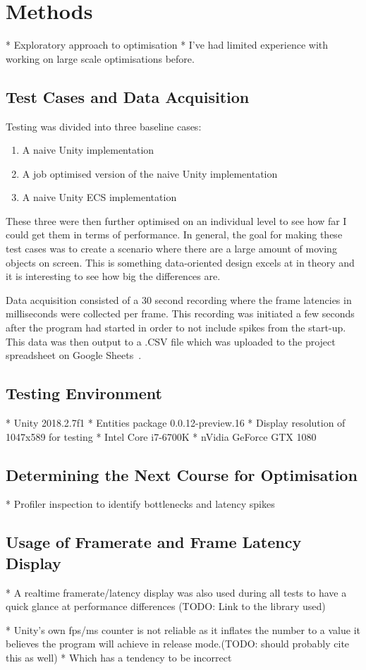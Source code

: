 \section{Methods}
   * Exploratory approach to optimisation
      * I've had limited experience with working on large scale optimisations before.

\subsection{Test Cases and Data Acquisition}
Testing was divided into three baseline cases:
\begin{enumerate}
    \item A naive Unity implementation
    \item A job optimised version of the naive Unity implementation
    \item A naive Unity ECS implementation
\end{enumerate}
These three were then further optimised on an individual level to see how far I could get them in terms of performance. In general, the goal for making these test cases was to create a scenario where there are a large amount of moving objects on screen. This is something data-oriented design excels at in theory and it is interesting to see how big the differences are. 

Data acquisition consisted of a 30 second recording where the frame latencies in milliseconds were collected per frame. This recording was initiated a few seconds after the program had started in order to not include spikes from the start-up. This data was then output to a .CSV file which was uploaded to the project spreadsheet on Google Sheets~\cite{projectSpreadsheet}.

\subsection{Testing Environment}
* Unity 2018.2.7f1
* Entities package 0.0.12-preview.16
* Display resolution of 1047x589 for testing
* Intel Core i7-6700K
* nVidia GeForce GTX 1080

\subsection{Determining the Next Course for Optimisation}
* Profiler inspection to identify bottlenecks and latency spikes

\subsection{Usage of Framerate and Frame Latency Display}
   * A realtime framerate/latency display was also used during all tests to have a quick glance at performance differences (TODO: Link to the library used)
   
   * Unity's own fps/ms counter is not reliable as it inflates the number to a value it believes the program will achieve in release mode.(TODO: should probably cite this as well) 
      * Which has a tendency to be incorrect
      